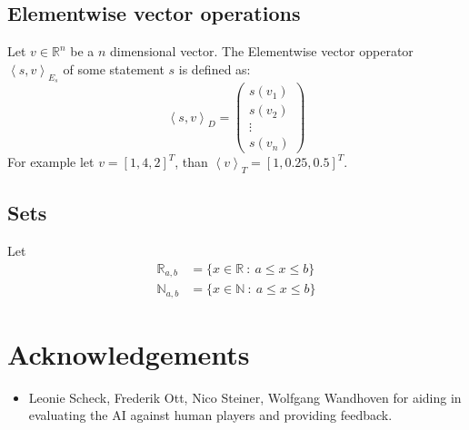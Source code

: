 \documentclass[12pt]{article}
\begin{document}
\subsection{Elementwise vector operations}
Let \(v \in \mathbb R^n\) be a \(n\) dimensional vector.
The Elementwise vector opperator \(\left<s, v\right>_{E_s}\) of some statement \(s\) is defined as:
\begin{equation}\label{eq:vectorElemetwise}
\left<s, v\right>_D = \left(\begin{matrix}
s(v_1) \\
s(v_2) \\
\vdots\\
s(v_n)
\end{matrix}\right)
\end{equation}
For example let \(v = [1, 4, 2]^T\), than \(\left<v\right>_T = [1, 0.25, 0.5]^T\).


\subsection{Sets}
Let
\begin{align}\label{set:Rab}
\mathbb R_{a, b} &= \{x \in \mathbb R~:~ a\leq x \leq b\}\\ \label{set:Nab}
\mathbb N_{a,b} & = \{x \in \mathbb N~:~a\leq x \leq b\}
\end{align}




\section*{Acknowledgements}
\begin{itemize}
\item Leonie Scheck, Frederik Ott, Nico Steiner, Wolfgang Wandhoven for aiding in evaluating the AI against human players and providing feedback.
\end{itemize}
\end{document}
